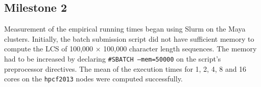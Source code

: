 \documentclass[usletter, 11pt]{extarticle}
\begin{document}
        \subsection{Milestone 2} Measurement of the empirical running times
        began using Slurm on the Maya clusters. Initially, the batch submission
        script did not have sufficient memory to compute the LCS of 100,000
        $\times$ 100,000 character length sequences. The memory had to be
        increased by declaring \texttt{\#SBATCH --mem=50000} on the script's
        preprocessor directives. The mean of the execution times for 1, 2, 4, 8
        and 16 cores on the \texttt{hpcf2013} nodes were computed successfully.

    \newpage
    
\end{document}
